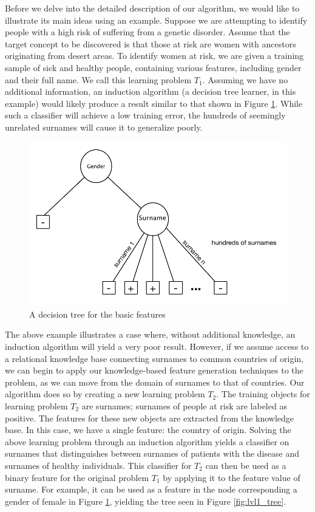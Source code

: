 \documentclass{article}
\theoremstyle{definition}
\begin{document}
Before we delve into the detailed description of our algorithm, we would like to illustrate its main ideas using an example.
Suppose we are attempting to identify people with a high risk of suffering from a genetic disorder. Assume that the target concept to be discovered is that those at risk are women with ancestors originating from desert areas. To identify women at risk, we are given a training sample of sick and healthy people, containing various features, including gender and their full name. We call this learning problem $T_1$.
Assuming we have no additional information, an induction algorithm (a decision tree learner, in this example) would likely produce a result similar to that shown in Figure \ref{fig:tree_base}. While such a classifier will achieve a low training error, the hundreds of seemingly unrelated surnames will cause it to generalize poorly. %

\begin{figure}[h]
	\centering
	\includegraphics[width=0.5\linewidth]{fig1.pdf}
	\caption{A decision tree for the basic features}
	\label{fig:tree_base}
\end{figure}

The above example illustrates a case where, without additional knowledge, an induction algorithm will yield a very poor result. %
However, if we assume access to a relational knowledge base connecting surnames to common countries of origin, we can begin to apply our knowledge-based feature generation techniques to the problem, as we can move from the domain of surnames to that of countries. 
Our algorithm does so by creating a new learning problem $T_2$. The training objects for learning problem $T_2$ are surnames; surnames of people at risk are labeled as positive. The features for these new objects are extracted from the knowledge base. In this case, we have a single feature: the country of origin.
Solving the above learning problem through an induction algorithm yields a classifier on surnames that distinguishes between surnames of patients with the disease and surnames of healthy individuals. This classifier for $T_2$ can then be used as a binary feature for the original problem $T_1$ by applying it to the feature value of surname. For example, it can be used as a feature in the node corresponding a gender of female in Figure \ref{fig:tree_base}, yielding the tree seen in Figure \ref{fig:lvl1_tree}. 
\end{document}
